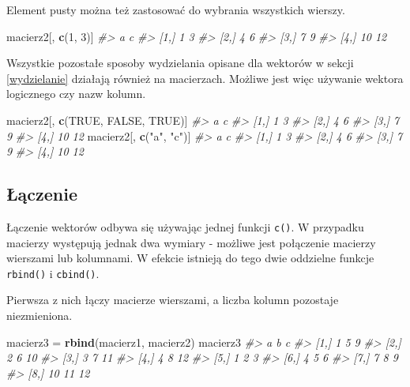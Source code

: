 \documentclass[paper=6in:9in,pagesize=pdftex,headinclude=on,footinclude=on,10pt]{scrbook}
\newenvironment{Shaded}{\begin{snugshade}}{\end{snugshade}}
\newcommand{\CommentTok}[1]{\textcolor[rgb]{0.56,0.35,0.01}{\textit{#1}}}
\newcommand{\DecValTok}[1]{\textcolor[rgb]{0.00,0.00,0.81}{#1}}
\newcommand{\KeywordTok}[1]{\textcolor[rgb]{0.13,0.29,0.53}{\textbf{#1}}}
\newcommand{\NormalTok}[1]{#1}
\newcommand{\OtherTok}[1]{\textcolor[rgb]{0.56,0.35,0.01}{#1}}
\newcommand{\StringTok}[1]{\textcolor[rgb]{0.31,0.60,0.02}{#1}}
\begin{document}
Element pusty można też zastosować do wybrania wszystkich wierszy.

\begin{Shaded}
\begin{Highlighting}[]
\NormalTok{macierz2[, }\KeywordTok{c}\NormalTok{(}\DecValTok{1}\NormalTok{, }\DecValTok{3}\NormalTok{)]}
\CommentTok{#>       a  c}
\CommentTok{#> [1,]  1  3}
\CommentTok{#> [2,]  4  6}
\CommentTok{#> [3,]  7  9}
\CommentTok{#> [4,] 10 12}
\end{Highlighting}
\end{Shaded}

Wszystkie pozostałe sposoby wydzielania opisane dla wektorów w sekcji \ref{wydzielanie} działają również na macierzach.
Możliwe jest więc używanie wektora logicznego czy nazw kolumn.

\begin{Shaded}
\begin{Highlighting}[]
\NormalTok{macierz2[, }\KeywordTok{c}\NormalTok{(}\OtherTok{TRUE}\NormalTok{, }\OtherTok{FALSE}\NormalTok{, }\OtherTok{TRUE}\NormalTok{)]}
\CommentTok{#>       a  c}
\CommentTok{#> [1,]  1  3}
\CommentTok{#> [2,]  4  6}
\CommentTok{#> [3,]  7  9}
\CommentTok{#> [4,] 10 12}
\NormalTok{macierz2[, }\KeywordTok{c}\NormalTok{(}\StringTok{"a"}\NormalTok{, }\StringTok{"c"}\NormalTok{)]}
\CommentTok{#>       a  c}
\CommentTok{#> [1,]  1  3}
\CommentTok{#> [2,]  4  6}
\CommentTok{#> [3,]  7  9}
\CommentTok{#> [4,] 10 12}
\end{Highlighting}
\end{Shaded}

\hypertarget{aczenie}{%
\subsection{Łączenie}\label{aczenie}}

Łączenie wektorów odbywa się używając jednej funkcji \texttt{c()}.
W przypadku macierzy występują jednak dwa wymiary - możliwe jest połączenie macierzy wierszami lub kolumnami.
W efekcie istnieją do tego dwie oddzielne funkcje \texttt{rbind()} i \texttt{cbind()}.

Pierwsza z nich łączy macierze wierszami, a liczba kolumn pozostaje niezmieniona.

\begin{Shaded}
\begin{Highlighting}[]
\NormalTok{macierz3 =}\StringTok{ }\KeywordTok{rbind}\NormalTok{(macierz1, macierz2)}
\NormalTok{macierz3}
\CommentTok{#>       a  b  c}
\CommentTok{#> [1,]  1  5  9}
\CommentTok{#> [2,]  2  6 10}
\CommentTok{#> [3,]  3  7 11}
\CommentTok{#> [4,]  4  8 12}
\CommentTok{#> [5,]  1  2  3}
\CommentTok{#> [6,]  4  5  6}
\CommentTok{#> [7,]  7  8  9}
\CommentTok{#> [8,] 10 11 12}
\end{Highlighting}
\end{Shaded}
\end{document}
